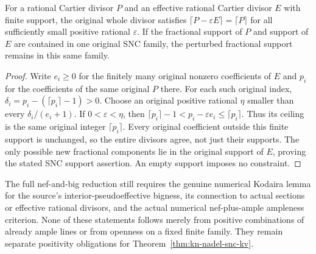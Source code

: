 \begin{lemma}
\label{lem:kn-nadel-nef-big-stable-ceiling}
\notready
For a rational Cartier divisor $P$ and an effective rational Cartier
divisor $E$ with finite support, the original whole divisor satisfies
$\lceil P-\varepsilon E\rceil=\lceil P\rceil$ for all sufficiently
small positive rational $\varepsilon$. If the fractional support of $P$
and support of $E$ are contained in one original SNC family, the perturbed
fractional support remains in this same family.
\end{lemma}
\begin{proof}
Write $e_i\geq0$ for the finitely many original nonzero coefficients
of $E$ and $p_i$ for the coefficients of the same original $P$ there.
For each such original index,
$\delta_i=p_i-(\lceil p_i\rceil-1)>0$. Choose an original positive
rational $\eta$ smaller than every $\delta_i/(e_i+1)$. If
$0<\varepsilon<\eta$, then
$\lceil p_i\rceil-1<p_i-\varepsilon e_i\leq\lceil p_i\rceil$.
Thus its ceiling is the same original integer $\lceil p_i\rceil$.
Every original coefficient outside this finite support is unchanged,
so the entire divisors agree, not just their supports. The only possible
new fractional components lie in the original support of $E$, proving
the stated SNC support assertion. An empty support imposes no constraint.
\end{proof}

The full nef-and-big reduction still requires the genuine numerical
Kodaira lemma for the source's interior-pseudoeffective bigness, its
connection to actual sections or effective rational divisors, and the
actual numerical nef-plus-ample ampleness criterion. None of these
statements follows merely from positive combinations of already ample
lines or from openness on a fixed finite family. They remain separate
positivity obligations for Theorem~\ref{thm:kn-nadel-snc-kv}.
